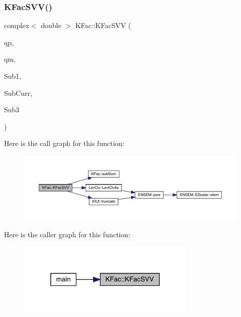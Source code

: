 \subsubsection{\texorpdfstring{KFacSVV()}{KFacSVV()}}
{\footnotesize\ttfamily complex$<$ double $>$ K\+Fac\+::\+K\+Fac\+S\+VV (\begin{DoxyParamCaption}\item[{Eigen\+::\+Vector\+Xd \&}]{qp,  }\item[{Eigen\+::\+Vector\+Xd \&}]{qm,  }\item[{map$<$ int, Eigen\+::\+Matrix\+Xcd $>$ \&}]{Sub1,  }\item[{map$<$ int, Eigen\+::\+Matrix\+Xcd $>$ \&}]{Sub\+Curr,  }\item[{map$<$ int, Eigen\+::\+Matrix\+Xcd $>$ \&}]{Sub3 }\end{DoxyParamCaption})}

Here is the call graph for this function\+:\nopagebreak
\begin{figure}[H]
\begin{center}
\leavevmode
\includegraphics[width=350pt]{d2/d89/namespaceKFac_a02b5c2876eea15ce628ac7cc58a4b746_cgraph}
\end{center}
\end{figure}
Here is the caller graph for this function\+:\nopagebreak
\begin{figure}[H]
\begin{center}
\leavevmode
\includegraphics[width=242pt]{d2/d89/namespaceKFac_a02b5c2876eea15ce628ac7cc58a4b746_icgraph}
\end{center}
\end{figure}
\mbox{\label{namespaceKFac_a2f18ad8b36ac24cc9534755cccb8c780}} 
